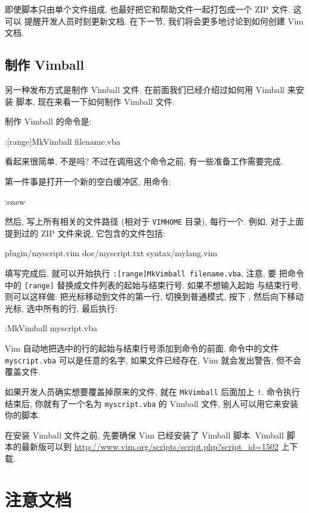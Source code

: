 即使脚本只由单个文件组成, 也最好把它和帮助文件一起打包成一个 ZIP 文件. 这可以
提醒开发人员时刻更新文档. 在下一节, 我们将会更多地讨论到如何创建 Vim 文档.

\subsection{制作 Vimball}
\label{subsec:making_vimball}

另一种发布方式是制作 Vimball 文件. 在前面我们已经介绍过如何用 Vimball 来安装
脚本, 现在来看一下如何制作 Vimball 文件.

制作 Vimball 的命令是:
\begin{vimcode}
:[range]MkVimball filename.vba
\end{vimcode}
看起来很简单, 不是吗? 不过在调用这个命令之前, 有一些准备工作需要完成.

第一件事是打开一个新的空白缓冲区, 用命令:
\begin{vimcode}
:enew
\end{vimcode}
然后, 写上所有相关的文件路径 (相对于 \texttt{VIMHOME} 目录), 每行一个. 例如,
对于上面提到过的 ZIP 文件来说, 它包含的文件包括:
\begin{vimcode}
plugin/myscript.vim
doc/myscript.txt
syntax/mylang.vim
\end{vimcode}
填写完成后, 就可以开始执行 \texttt{:[range]MkVimball filename.vba}, 注意, 要
把命令中的 \texttt{[range]} 替换成文件列表的起始与结束行号. 如果不想输入起始
与结束行号, 则可以这样做: 把光标移动到文件的第一行, 切换到普通模式, 按下
, 然后向下移动光标, 选中所有的行, 最后执行:
\begin{vimcode}
:MkVimball myscript.vba
\end{vimcode}
Vim 自动地把选中的行的起始与结束行号添加到命令的前面. 命令中的文件
\texttt{myscript.vba} 可以是任意的名字, 如果文件已经存在, Vim 就会发出警告,
但不会覆盖文件.

如果开发人员确实想要覆盖掉原来的文件, 就在 \texttt{MkVimball} 后面加上
\texttt{!}. 命令执行结束后, 你就有了一个名为 \texttt{myscript.vba} 的 Vimball
文件, 别人可以用它来安装你的脚本.

\begin{warning}
    在安装 Vimball 文件之前, 先要确保 Vim 已经安装了 Vimball 脚本. Vimball 脚
    本的最新版可以到 \url{http://www.vim.org/scripts/script.php?script_id=1502}
    上下载.
\end{warning}

\section{注意文档}
\label{sec:remember_the_documentation}

